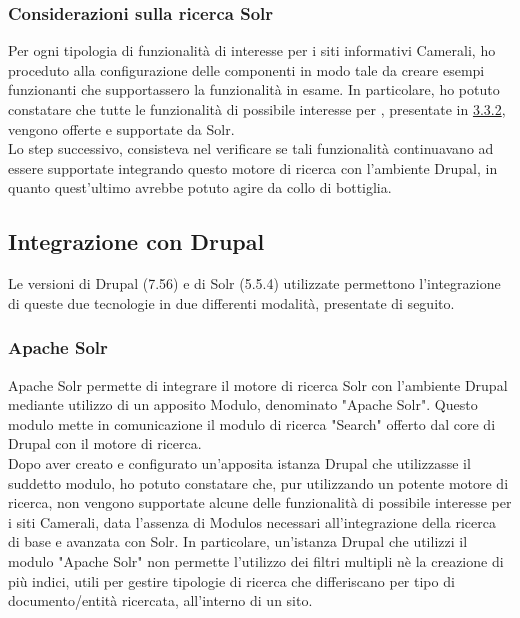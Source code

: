 			\subsubsection{Considerazioni sulla ricerca Solr}
			Per ogni tipologia di funzionalità di interesse per i siti informativi Camerali, ho proceduto alla configurazione delle componenti in modo tale da creare esempi funzionanti che supportassero la funzionalità in esame. In particolare, ho potuto constatare che tutte le funzionalità di possibile interesse per \nomeAzienda, presentate in \hyperref[sub:possibile_evoluzione]{3.3.2}, vengono offerte e supportate da \gls{Solr}. \\
			Lo step successivo, consisteva nel verificare se tali funzionalità continuavano ad essere supportate integrando questo motore di ricerca con l'ambiente \gls{Drupal}, in quanto quest'ultimo avrebbe potuto agire da collo di bottiglia.

		\subsection{Integrazione con Drupal}
		Le versioni di \gls{Drupal} (7.56) e di \gls{Solr} (5.5.4) utilizzate permettono l'integrazione di queste due tecnologie in due differenti modalità, presentate di seguito.
		
			\subsubsection{Apache Solr}
			Apache Solr permette di integrare il motore di ricerca \gls{Solr} con l'ambiente \gls{Drupal} mediante utilizzo di un apposito \gls{Modulo}, denominato "Apache Solr". Questo modulo mette in comunicazione il modulo di ricerca "Search" offerto dal core di \gls{Drupal} con il motore di ricerca. \\
			Dopo aver creato e configurato un'apposita istanza \gls{Drupal} che utilizzasse il suddetto modulo, ho potuto constatare che, pur utilizzando un potente motore di ricerca, non vengono supportate alcune delle funzionalità di possibile interesse per i siti Camerali, data l'assenza di \glspl{Modulo} necessari all'integrazione della ricerca di base e avanzata con \gls{Solr}. In particolare, un'istanza \gls{Drupal} che utilizzi il modulo "Apache Solr" non permette l'utilizzo dei filtri multipli nè la creazione di più indici, utili per gestire tipologie di ricerca che differiscano per tipo di documento/entità ricercata, all'interno di un sito.
			
